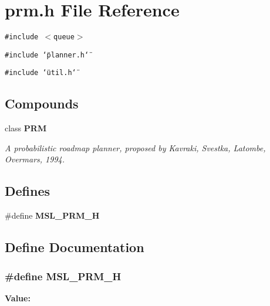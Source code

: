 \section{prm.h File Reference}
\label{prm_8h}
{\tt \#include $<$queue$>$}\par
{\tt \#include \char`\"{}planner.h\char`\"{}}\par
{\tt \#include \char`\"{}util.h\char`\"{}}\par
\subsection*{Compounds}
\begin{CompactItemize}
\item 
class {\bf PRM}
\begin{CompactList}\small\item\em A probabilistic roadmap planner, proposed by Kavraki, Svestka, Latombe, Overmars, 1994.\item\end{CompactList}\end{CompactItemize}
\subsection*{Defines}
\begin{CompactItemize}
\item 
\#define {\bf MSL\_\-PRM\_\-H}
\end{CompactItemize}


\subsection{Define Documentation}
\subsubsection{\setlength{\rightskip}{0pt plus 5cm}\#define MSL\_\-PRM\_\-H}\label{prm_8h_a0}


{\bf Value:}\footnotesize\begin{verbatim}
\end{verbatim}\normalsize 
